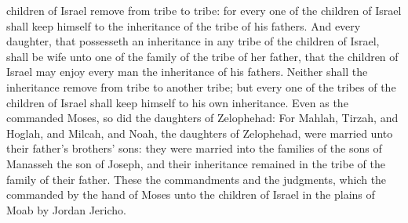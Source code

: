 {children of
Israel
remove from
tribe to
tribe: for every
one of the
children of
Israel shall
keep himself to the
inheritance of the
tribe of his
fathers.
And every
daughter, that
possesseth an
inheritance in any
tribe of the
children of
Israel, shall be
wife unto
one of the
family of the
tribe of her
father, that the
children of
Israel may
enjoy every
man the
inheritance of his
fathers.
Neither shall the
inheritance
remove from
{}
tribe to
another
tribe; but every
one of the
tribes of the
children of
Israel shall
keep himself to his own
inheritance.
Even as the
{}
commanded
Moses, so
did the
daughters of
Zelophehad:
For
Mahlah,
Tirzah, and
Hoglah, and
Milcah, and
Noah, the
daughters of
Zelophehad, were
married unto their
father’s
brothers’ sons:
 they were
married into the
families of the
sons of
Manasseh the
son of
Joseph, and their
inheritance remained in the
tribe of the
family of their
father.
These
{} the
commandments and the
judgments, which the
{}
commanded by the
hand of
Moses unto the
children of
Israel in the
plains of
Moab by
Jordan
{}
Jericho.
\par }